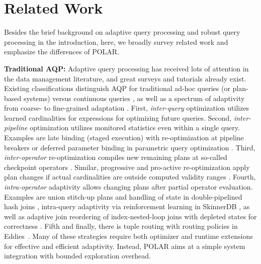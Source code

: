 \section{Related Work}
\label{related-work}
%
Besides the brief background on adaptive query processing and robust query processing in the introduction, here, we broadly survey related work and emphasize the differences of POLAR.

\textbf{Traditional AQP:} Adaptive query processing has received lots of attention in the data management literature, and great surveys \cite{BabuB05,DeshpandeIR07} and tutorials \cite{IvesDR07,DeshpandeHR06} already exist. Existing classifications distinguish AQP for traditional ad-hoc queries (or plan-based systems) versus continuous queries \cite{BabuB05}, as well as a spectrum of adaptivity from coarse- to fine-grained adaptation \cite{DeshpandeHR06}.
First, \emph{inter-query} optimization utilizes learned cardinalities for expressions \cite{BrunoC02,ChenR94,StillgerLMK01} for optimizing future queries. Second, \emph{inter-pipeline} optimization utilizes monitored statistics even within a single query. Examples are late binding (staged execution) with re-optimization at pipeline breakers \cite{DeshpandeHR06} or deferred parameter binding in parametric query optimization \cite{BizarroBD09}. Third, \emph{inter-operator} re-optimization compiles new remaining plans at so-called checkpoint operators \cite{KabraD98}. Similar, progressive and pro-active re-optimization apply plan changes if actual cardinalities are outside computed validity ranges \cite{MarklRSLP04,BabuBD05}. Fourth, \emph{intra-operator} adaptivity allows changing plans after partial operator evaluation. Examples are union stitch-up plans and handling of state in double-pipelined hash joins \cite{IvesHW04}, intra-query adaptivity via reinforcement learning in SkinnerDB \cite{TrummerWMMJA19,TrummerWWMMJAR21,WeiT22}, as well as adaptive join reordering of index-nested-loop joins with depleted states for correctness \cite{LiSMBCL07}. Fifth and finally, there is tuple routing with routing policies in Eddies~\cite{HellersteinA00,Arpaci-Dusseau03,Deshpande04,BizarroBDW05}. Many of these strategies require both optimizer and runtime extensions for effective and efficient adaptivity. Instead, POLAR aims at a simple system integration with bounded exploration overhead.

